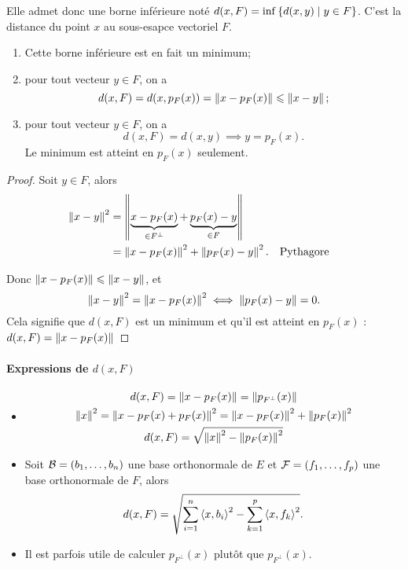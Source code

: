 Elle admet donc une borne inférieure noté \(d(x,F)=\inf\left\{d(x,y)\mathrel{}\middle|\mathrel{}y \in F\right\}\). C'est la distance du point \(x\) au sous-esapce vectoriel \(F\).

\begin{theo}
  \begin{enumerate}
  \item Cette borne inférieure est en fait un minimum;
  \item pour tout vecteur \(y \in F\), on a
    \begin{equation}
      d(x,F) = d(x,p_F(x)) = \left\lVert x-p_F(x)\right\rVert \leqslant \left\lVert x-y\right\rVert;    
    \end{equation}
  \item pour tout vecteur \(y \in F\), on a
    \begin{equation}
      d(x,F) = d(x,y) \implies y=p_F(x).
    \end{equation}
    Le minimum est atteint en \(p_F(x)\) seulement.
  \end{enumerate}
\end{theo}
\begin{proof}
  Soit \(y \in F\), alors
  \begin{align}
    \left\lVert x-y\right\rVert^2 &=\left\lVert\underbrace{x-p_F(x)}_{\in F^\perp} + \underbrace{p_F(x)-y}_{\in F}\right\rVert\\
    &=\left\lVert x-p_F(x)\right\rVert^2 + \left\lVert p_F(x)-y\right\rVert^2. && \text{Pythagore}
  \end{align}
  
  Donc \(\left\lVert x-p_F(x)\right\rVert \leqslant \left\lVert x-y\right\rVert\), et
  \begin{equation}
    \left\lVert x-y\right\rVert^2 = \left\lVert x-p_F(x)\right\rVert^2 \iff  \left\lVert p_F(x)-y\right\rVert=0.
  \end{equation}
  Cela signifie que \(d(x,F)\) est un minimum et qu'il est atteint en \(p_F(x)\) : \(d(x,F)=\left\lVert x-p_F(x)\right\rVert\)
\end{proof}

\paragraph{Expressions de \(d(x,F)\)}

\begin{itemize}
\item
  \begin{gather}
    d(x,F) = \left\lVert x-p_F(x)\right\rVert = \left\lVert p_{F^\perp}(x)\right\rVert \\
    \left\lVert x\right\rVert^2 = \left\lVert x-p_F(x)+p_F(x)\right\rVert^2=\left\lVert x-p_F(x)\right\rVert^2+\left\lVert p_F(x)\right\rVert^2\\
    d(x,F) = \sqrt{\left\lVert x\right\rVert^2-\left\lVert p_F(x)\right\rVert^2}
  \end{gather}
\item Soit \(\mathcal{B}=(b_1,\ldots, b_n)\) une base orthonormale de \(E\) et \(\mathcal{F}=(f_1,\ldots, f_p)\) une base orthonormale de \(F\), alors
  \begin{equation}
    d(x,F) = \sqrt{\sum_{i=1}^n\left\langle{x},{b_i}\right\rangle^2-\sum_{k=1}^p\left\langle{x},{f_k}\right\rangle^2}.
  \end{equation}
\item Il est parfois utile de calculer \(p_{F^\perp}(x)\) plutôt que \(p_{F^\perp}(x)\).
\end{itemize}

